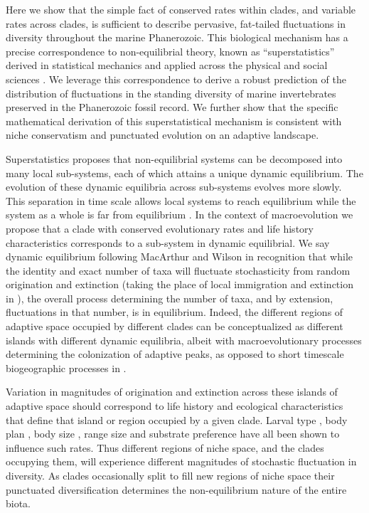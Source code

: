 \documentclass[12pt]{article}
\let\citep=\cite
\begin{document}
Here we show that the simple fact of conserved rates within clades,
and variable rates across clades, is sufficient to describe pervasive,
fat-tailed fluctuations in diversity throughout the marine
Phanerozoic.  This biological mechanism has a precise correspondence
to non-equilibrial theory, known as ``superstatistics'' derived in
statistical mechanics \citep{beck2003} and applied across the physical
and social sciences \citep{beck2004, fuentes2009}. We leverage this
correspondence to derive a robust prediction of the distribution of
fluctuations in the standing diversity of marine invertebrates
preserved in the Phanerozoic fossil record. We further show that the
specific mathematical derivation of this superstatistical mechanism is
consistent with niche conservatism and punctuated evolution on an
adaptive landscape.

Superstatistics \citep{beck2003} proposes that non-equilibrial systems
can be decomposed into many local sub-systems, each of which attains a
unique dynamic equilibrium. The evolution of these dynamic equilibria
across sub-systems evolves more slowly. This separation in time scale
allows local systems to reach equilibrium while the system as a whole
is far from equilibrium \citep{beck2003}. In the context of
macroevolution we propose that a clade with conserved evolutionary
rates and life history characteristics corresponds to a sub-system in
dynamic equilibrial.  We say dynamic equilibrium following MacArthur
and Wilson \citep{macWilson} in recognition that while the identity
and exact number of taxa will fluctuate stochasticity from random
origination and extinction (taking the place of local immigration and
extinction in \citep{macWilson}), the overall process determining the
number of taxa, and by extension, fluctuations in that number, is in
equilibrium. Indeed, the different regions of adaptive space occupied
by different clades can be conceptualized as different islands with
different dynamic equilibria, albeit with macroevolutionary processes
determining the colonization of adaptive peaks, as opposed to short
timescale biogeographic processes in \citep{macWilson}.

Variation in magnitudes of origination and extinction across these
islands of adaptive space should correspond to life history and
ecological characteristics that define that island or region occupied
by a given clade. Larval type \citep{jablonski2008}, body plan
\citep{erwin2012}, body size \citep{harnik2011}, range size
\citep{harnik2011, foote2008paleobiol} and substrate preference
\citep{hopkins2014} have all been shown to influence such rates. Thus
different regions of niche space, and the clades occupying them, will
experience different magnitudes of stochastic fluctuation in
diversity. As clades occasionally split to fill new regions of niche
space their punctuated diversification determines the non-equilibrium
nature of the entire biota.
\end{document}
